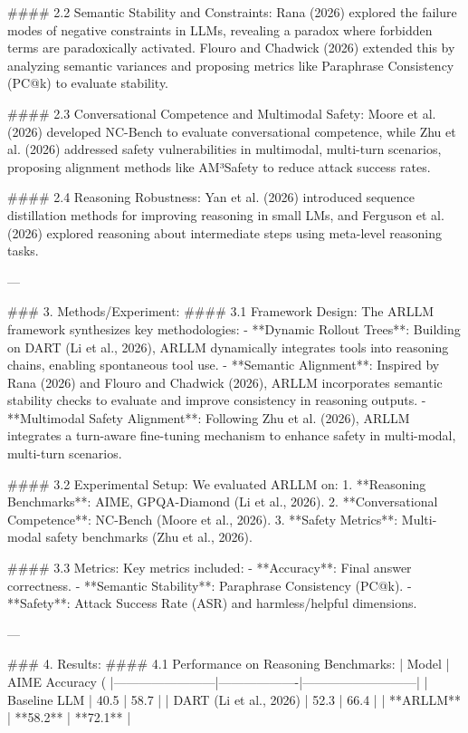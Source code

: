 #### 2.2 Semantic Stability and Constraints:
Rana (2026) explored the failure modes of negative constraints in LLMs, revealing a paradox where forbidden terms are paradoxically activated. Flouro and Chadwick (2026) extended this by analyzing semantic variances and proposing metrics like Paraphrase Consistency (PC@k) to evaluate stability.

#### 2.3 Conversational Competence and Multimodal Safety:
Moore et al. (2026) developed NC-Bench to evaluate conversational competence, while Zhu et al. (2026) addressed safety vulnerabilities in multimodal, multi-turn scenarios, proposing alignment methods like AM³Safety to reduce attack success rates.

#### 2.4 Reasoning Robustness:
Yan et al. (2026) introduced sequence distillation methods for improving reasoning in small LMs, and Ferguson et al. (2026) explored reasoning about intermediate steps using meta-level reasoning tasks.

---

### 3. Methods/Experiment:
#### 3.1 Framework Design:
The ARLLM framework synthesizes key methodologies:
- **Dynamic Rollout Trees**: Building on DART (Li et al., 2026), ARLLM dynamically integrates tools into reasoning chains, enabling spontaneous tool use.
- **Semantic Alignment**: Inspired by Rana (2026) and Flouro and Chadwick (2026), ARLLM incorporates semantic stability checks to evaluate and improve consistency in reasoning outputs.
- **Multimodal Safety Alignment**: Following Zhu et al. (2026), ARLLM integrates a turn-aware fine-tuning mechanism to enhance safety in multi-modal, multi-turn scenarios.

#### 3.2 Experimental Setup:
We evaluated ARLLM on:
1. **Reasoning Benchmarks**: AIME, GPQA-Diamond (Li et al., 2026).
2. **Conversational Competence**: NC-Bench (Moore et al., 2026).
3. **Safety Metrics**: Multi-modal safety benchmarks (Zhu et al., 2026).

#### 3.3 Metrics:
Key metrics included:
- **Accuracy**: Final answer correctness.
- **Semantic Stability**: Paraphrase Consistency (PC@k).
- **Safety**: Attack Success Rate (ASR) and harmless/helpful dimensions.

---

### 4. Results:
#### 4.1 Performance on Reasoning Benchmarks:
| Model                  | AIME Accuracy (%
|------------------------|-------------------|---------------------------|
| Baseline LLM           | 40.5             | 58.7                      |
| DART (Li et al., 2026) | 52.3             | 66.4                      |
| **ARLLM**              | **58.2**         | **72.1**                  |

